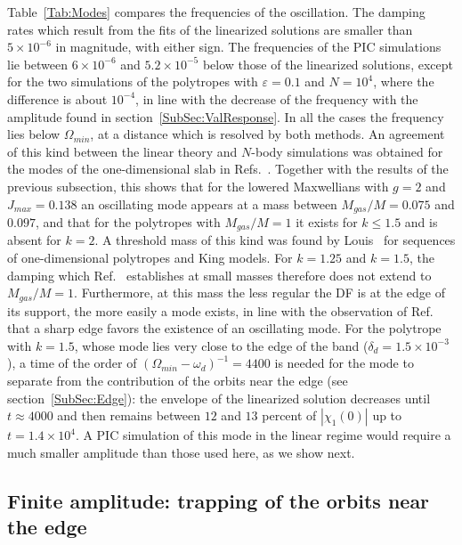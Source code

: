 Table~\ref{Tab:Modes} compares the frequencies of the oscillation. The damping rates which result from the fits of the linearized solutions are smaller than $5\times 10^{-6}$ in magnitude, with either sign. The frequencies of the PIC simulations lie between $6\times 10^{-6}$ and $5.2\times 10^{-5}$ below those of the linearized solutions, except for the two simulations of the polytropes with $\varepsilon = 0.1$ and $N = 10^4$, where the difference is about $10^{-4}$, in line with the decrease of the frequency with the amplitude found in section~\ref{SubSec:ValResponse}. In all the cases the frequency lies below $\Omega_{min}$, at a distance which is resolved by both methods. An agreement of this kind between the linear theory and $N$-body simulations was obtained for the modes of the one-dimensional slab in Refs.~\cite{mW91,pL92}. Together with the results of the previous subsection, this shows that for the lowered Maxwellians with $g = 2$ and $J_{max} = 0.138$ an oscillating mode appears at a mass between $M_{gas}/M = 0.075$ and $0.097$, and that for the polytropes with $M_{gas}/M = 1$ it exists for $k\leq 1.5$ and is absent for $k = 2$. A threshold mass of this kind was found by Louis~\cite{pL92} for sequences of one-dimensional polytropes and King models. For $k = 1.25$ and $k = 1.5$, the damping which Ref.~\cite{mHgRmScS25} establishes at small masses therefore does not extend to $M_{gas}/M = 1$. Furthermore, at this mass the less regular the DF is at the edge of its support, the more easily a mode exists, in line with the observation of Ref.~\cite{mW91} that a sharp edge favors the existence of an oscillating mode. For the polytrope with $k = 1.5$, whose mode lies very close to the edge of the band ($\delta_d = 1.5\times 10^{-3}$), a time of the order of $(\Omega_{min} - \omega_d)^{-1} = 4400$ is needed for the mode to separate from the contribution of the orbits near the edge (see section~\ref{SubSec:Edge}): the envelope of the linearized solution decreases until $t\approx 4000$ and then remains between $12$ and $13$ percent of $|\chi_1(0)|$ up to $t = 1.4\times 10^4$. A PIC simulation of this mode in the linear regime would require a much smaller amplitude than those used here, as we show next. 


\subsection{Finite amplitude: trapping of the orbits near the edge}
\label{SubSec:FixedLTrapping}

